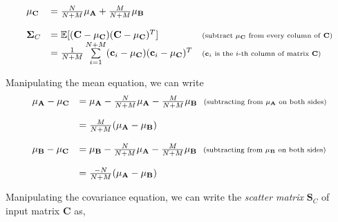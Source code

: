\begin{equation}
\begin{array}{llll}
\mathbf{\mu}_\mathbf{C} &= \frac{N}{N+M}\mathbf{\mu}_\mathbf{A} + \frac{M}{N+M}\mathbf{\mu}_\mathbf{B}\\\\
\mathbf{\Sigma}_C &= \mathbb{E}[(\mathbf{C}-\mathbf{\mu}_\mathbf{C})(\mathbf{C}-\mu_\mathbf{C})^T] & \textrm{\scriptsize (subtract $\mathbf{\mu}_\mathbf{C}$ from every column of \textbf{C})}\\
&=\frac{1}{N+M}\sum\limits_{i=1}^{N+M} (\mathbf{c}_i-\mathbf{\mu}_\mathbf{C})(\mathbf{c}_i-\mu_\mathbf{C})^T & \textrm{\scriptsize ($\mathbf{c}_i$ is the $i$-th column of matrix $\mathbf{C}$)}\\
\end{array}
\end{equation}

Manipulating the mean equation, we can write
\begin{equation}
\begin{array}{llll}
\mathbf{\mu}_\mathbf{A} -\mathbf{\mu}_\mathbf{C} &= \mathbf{\mu}_\mathbf{A} - \frac{N}{N+M}\mathbf{\mu}_\mathbf{A} - \frac{M}{N+M}\mathbf{\mu}_\mathbf{B} \ \ \scriptsize{\textrm{(subtracting from $\mathbf{\mu}_\mathbf{A}$ on both sides)}}\\\\

&=\frac{M}{N+M}(\mathbf{\mu}_\mathbf{A} - \mathbf{\mu}_\mathbf{B})\\\\

\mathbf{\mu}_\mathbf{B} -\mathbf{\mu}_\mathbf{C} &= \mathbf{\mu}_\mathbf{B} - \frac{N}{N+M}\mathbf{\mu}_\mathbf{A} - \frac{M}{N+M}\mathbf{\mu}_\mathbf{B} \ \ \scriptsize{\textrm{(subtracting from $\mathbf{\mu}_\mathbf{B}$ on both sides)}}\\\\

&=\frac{-N}{N+M}(\mathbf{\mu}_\mathbf{A} - \mathbf{\mu}_\mathbf{B})
\end{array}
\end{equation}


Manipulating the covariance equation, we can write the \emph{scatter matrix} $\mathbf{S}_C$ of input matrix $\mathbf{C}$ as,

